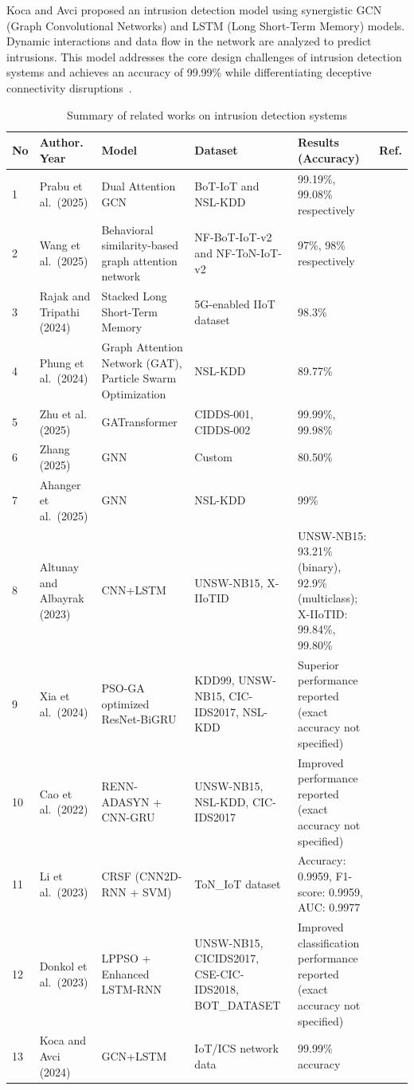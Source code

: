 \documentclass[a4paper,fleqn]{cas-sc}
\begin{document}
Koca and Avci proposed an intrusion detection model using synergistic GCN (Graph Convolutional Networks) and LSTM (Long Short-Term Memory) models. Dynamic interactions and data flow in the network are analyzed to predict intrusions. This model addresses the core design challenges of intrusion detection systems and achieves an accuracy of 99.99\% while differentiating deceptive connectivity disruptions~\cite{bib18}.


\begin{table}[tp]
\caption{Summary of related works on intrusion detection systems}\label{tab:related_work}
\centering
\small
\begin{tabular}{@{}p{0.4cm}p{1.8cm}p{2.8cm}p{2.0cm}p{2.6cm}p{0.8cm}@{}}
\toprule
No & Author. Year  & Model  &  Dataset  &  Results (Accuracy) &  Ref. \\
\midrule
1 & Prabu et al.\ (2025) & Dual Attention GCN & BoT-IoT and NSL-KDD & 99.19\%, 99.08\% respectively &~\cite{bib6} \\
2 & Wang et al.\ (2025) & Behavioral similarity-based graph attention network & NF-BoT-IoT-v2 and NF-ToN-IoT-v2  & 97\%, 98\% respectively &~\cite{bib7} \\
3 & Rajak and Tripathi (2024) & Stacked Long Short-Term Memory & 5G-enabled IIoT dataset & 98.3\% &~\cite{bib8} \\
4 & Phung et al.\ (2024) & Graph Attention Network (GAT), Particle Swarm Optimization & NSL-KDD & 89.77\% &~\cite{bib9} \\
5 & Zhu et al. (2025) & GATransformer & CIDDS-001, CIDDS-002 & 99.99\%, 99.98\% &~\cite{bib10} \\
6 & Zhang (2025) & GNN & Custom & 80.50\% &~\cite{bib11} \\
7 & Ahanger et al.\ (2025) & GNN & NSL-KDD & 99\% &~\cite{bib12} \\
8 & Altunay and Albayrak (2023) & CNN+LSTM & UNSW-NB15, X-IIoTID & UNSW-NB15: 93.21\% (binary), 92.9\% (multiclass); X-IIoTID: 99.84\%, 99.80\% &~\cite{bib13} \\
9 & Xia et al.\ (2024) & PSO-GA optimized ResNet-BiGRU & KDD99, UNSW-NB15, CIC-IDS2017, NSL-KDD & Superior performance reported (exact accuracy not specified) &~\cite{bib14} \\
10 & Cao et al.\ (2022) & RENN-ADASYN + CNN-GRU & UNSW-NB15, NSL-KDD, CIC-IDS2017 & Improved performance reported (exact accuracy not specified) &~\cite{bib15} \\
11 & Li et al.\ (2023) & CRSF (CNN2D-RNN + SVM) & ToN\_IoT dataset & Accuracy: 0.9959, F1-score: 0.9959, AUC: 0.9977 &~\cite{bib16} \\
12 & Donkol et al.\ (2023) & LPPSO + Enhanced LSTM-RNN & UNSW-NB15, CICIDS2017, CSE-CIC-IDS2018, BOT\_DATASET & Improved classification performance reported (exact accuracy not specified) &~\cite{bib17} \\
13 & Koca and Avci (2024) & GCN+LSTM & IoT/ICS network data & 99.99\% accuracy &~\cite{bib18} \\
\bottomrule
\end{tabular}
\end{table}
\end{document}
